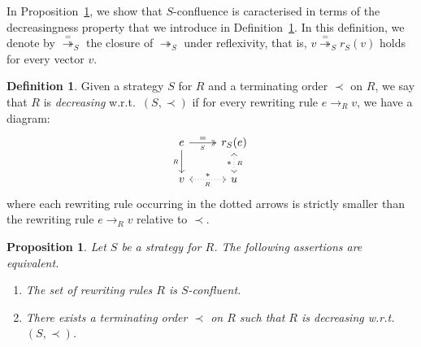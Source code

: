 \documentclass[11pt]{article}
\newtheorem{proposition}[theorem]{Proposition}
\theoremstyle{definition}
\newtheorem{definition}[theorem]{Definition}
\newcommand\rewR{\to_R}
\newcommand\parS{\twoheadrightarrow_S}
\begin{document}
In Proposition~\ref{prop:S-conf_decreasing}, we show that $S$-confluence
is caracterised in terms of the decreasingness property that we introduce
in Definition~\ref{def:decreasing}. In this definition, we denote by
$\overset{=}{\twoheadrightarrow}_S$ the closure of $\parS$ under
reflexivity, that is, $v\overset{=}{\twoheadrightarrow}_Sr_S(v)$ holds 
for every vector $v$.
\smallskip

\begin{definition}\label{def:decreasing}
  Given a strategy $S$ for $R$ and a terminating order $\prec$ on $R$, we
  say that $R$ is {\em decreasing} w.r.t.\ $(S,\prec)$ if for every
  rewriting rule $e\rewR v$, we have a diagram:
  \[\begin{tikzcd}
      e\ar[d, "_R"']\ar[r, twoheadrightarrow, "=", "_S"'] &
      r_S(e)\ar[d, leftrightarrow, dotted, "*"', "_R"]\\
      v\ar[r, leftrightarrow, dotted, "*", "_R"'] & u
    \end{tikzcd}\]
  where each rewriting rule occurring in the dotted arrows is strictly
  smaller than the rewriting rule $e\rewR v$ relative to $\prec$.
\end{definition}
\smallskip

\begin{proposition}\label{prop:S-conf_decreasing}
  Let $S$ be a strategy for $R$. The following assertions are equivalent.
  \begin{enumerate}
  \item The set of rewriting rules $R$ is $S$-confluent.
  \item There exists a terminating order $\prec$ on $R$ such that $R$ is
    decreasing w.r.t.\ $(S,\prec)$.
  \end{enumerate}
\end{proposition}
\end{document}
